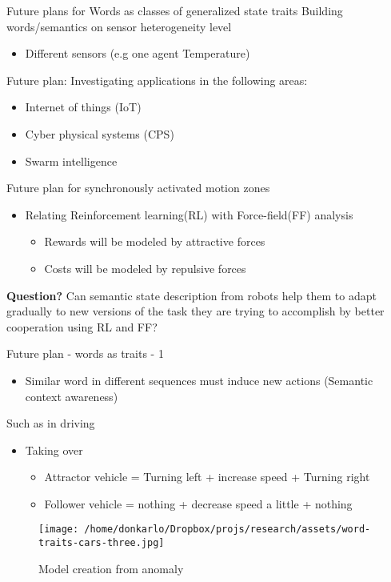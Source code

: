 \documentclass[unknownkeysallowed]{beamer}
\begin{document}
	\begin{frame}{Future plans for Words as classes of generalized state traits}
		Building words/semantics on sensor heterogeneity level
		\begin{itemize}
			\item Different sensors (e.g one agent Temperature)
		\end{itemize}
	\end{frame}

	\begin{frame}{Future plan: Investigating applications in the following areas:}
		\begin{itemize}
			\item Internet of things (IoT)
			\item Cyber physical systems (CPS)
			\item Swarm intelligence
		\end{itemize}
	\end{frame}
	\begin{frame}{Future plan for synchronously activated motion zones}
		\begin{itemize}
			\item Relating Reinforcement learning(RL) with Force-field(FF) analysis
				\begin{itemize}
					\item Rewards will be modeled by attractive forces
					\item Costs will be modeled by repulsive forces
				\end{itemize}
		\end{itemize}
		\textbf{Question?} Can semantic state description from robots help them to adapt gradually to new versions of the task they are trying to accomplish by better cooperation using RL and FF? 
	\end{frame}

	\begin{frame}{Future plan - words as traits - 1}
		\begin{itemize}
			\item Similar word in different sequences must induce new actions (Semantic context awareness)
		\end{itemize}
		Such as in driving
		\begin{itemize}
			\item Taking over
				\begin{itemize}
					\item Attractor vehicle  = Turning left + increase speed + Turning right
					\item Follower vehicle = nothing + decrease speed a little + nothing
				\end{itemize}
		\end{itemize}
		\begin{figure}
			\texttt{[image: /home/donkarlo/Dropbox/projs/research/assets/word-traits-cars-three.jpg]}
			\caption{Model creation from anomaly}
		\end{figure}
	\end{frame}
\end{document}
